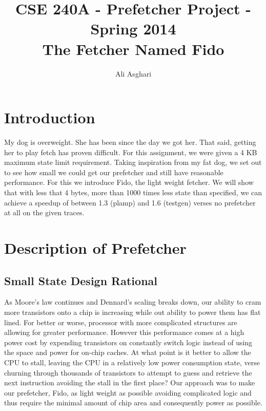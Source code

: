 \documentclass[11pt]{article}
\begin{document}
\title{CSE 240A - Prefetcher Project - Spring 2014 \\  \large The Fetcher Named Fido}

\author{Ali Asghari}
\date{}
\maketitle

\section{Introduction}
My dog is overweight. She has been since the day we got her.  That said, getting her to play fetch has proven difficult. For this assignment, we were given a 4 KB maximum state limit requirement. Taking inspiration from my fat dog, we set out to see how small we could get our prefetcher and still have reasonable performance. For this we introduce Fido, the light weight fetcher. We will show that with less that 4 bytes, more than 1000 times less state than specified, we can achieve a speedup of between 1.3 (plamp) and 1.6 (testgen) verses no prefetcher at all on the given traces.    
  
\section{Description of Prefetcher}
\subsection{Small State Design Rational}
As Moore's law continues and Dennard's scaling breaks down, our ability to cram more transistors onto a chip is increasing while out ability to power them has flat lined. For better or worse, processor with more complicated structures are allowing for greater performance. However this performance comes at a high power cost by expending transistors on constantly switch logic instead of using the space and power for on-chip caches. At what point is it better to allow the CPU to stall, leaving the CPU in a relatively low power consumption state, verse churning through thousands of transistors to attempt to guess and retrieve the next instruction avoiding the stall in the first place? Our approach was to make our prefetcher, Fido, as light weight as possible avoiding complicated logic and thus require the minimal amount of chip area and consequently power as possible.
\end{document}
